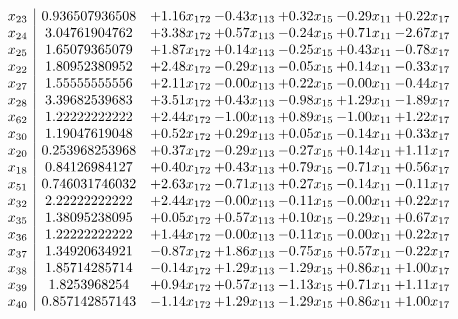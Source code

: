 \documentclass[8pt]{article}
\begin{document}
\[\begin{array}{c| c c@{\hskip 2pt} c@{\hskip 2pt} c@{\hskip 2pt} c@{\hskip 2pt} c@{\hskip 2pt} }
 x_{23}   &  0.936507936508 & +  1.16 x_{172} & -0.43 x_{113} & +  0.32 x_{15} & -0.29 x_{11} & +  0.22 x_{17}\\
 x_{24}   &  3.04761904762 & +  3.38 x_{172} & +  0.57 x_{113} & -0.24 x_{15} & +  0.71 x_{11} & -2.67 x_{17}\\
 x_{25}   &  1.65079365079 & +  1.87 x_{172} & +  0.14 x_{113} & -0.25 x_{15} & +  0.43 x_{11} & -0.78 x_{17}\\
 x_{22}   &  1.80952380952 & +  2.48 x_{172} & -0.29 x_{113} & -0.05 x_{15} & +  0.14 x_{11} & -0.33 x_{17}\\
 x_{27}   &  1.55555555556 & +  2.11 x_{172} & -0.00 x_{113} & +  0.22 x_{15} & -0.00 x_{11} & -0.44 x_{17}\\
 x_{28}   &  3.39682539683 & +  3.51 x_{172} & +  0.43 x_{113} & -0.98 x_{15} & +  1.29 x_{11} & -1.89 x_{17}\\
 x_{62}   &  1.22222222222 & +  2.44 x_{172} & -1.00 x_{113} & +  0.89 x_{15} & -1.00 x_{11} & +  1.22 x_{17}\\
 x_{30}   &  1.19047619048 & +  0.52 x_{172} & +  0.29 x_{113} & +  0.05 x_{15} & -0.14 x_{11} & +  0.33 x_{17}\\
 x_{20}   &  0.253968253968 & +  0.37 x_{172} & -0.29 x_{113} & -0.27 x_{15} & +  0.14 x_{11} & +  1.11 x_{17}\\
 x_{18}   &  0.84126984127 & +  0.40 x_{172} & +  0.43 x_{113} & +  0.79 x_{15} & -0.71 x_{11} & +  0.56 x_{17}\\
 x_{51}   &  0.746031746032 & +  2.63 x_{172} & -0.71 x_{113} & +  0.27 x_{15} & -0.14 x_{11} & -0.11 x_{17}\\
 x_{32}   &  2.22222222222 & +  2.44 x_{172} & -0.00 x_{113} & -0.11 x_{15} & -0.00 x_{11} & +  0.22 x_{17}\\
 x_{35}   &  1.38095238095 & +  0.05 x_{172} & +  0.57 x_{113} & +  0.10 x_{15} & -0.29 x_{11} & +  0.67 x_{17}\\
 x_{36}   &  1.22222222222 & +  1.44 x_{172} & -0.00 x_{113} & -0.11 x_{15} & -0.00 x_{11} & +  0.22 x_{17}\\
 x_{37}   &  1.34920634921 & -0.87 x_{172} & +  1.86 x_{113} & -0.75 x_{15} & +  0.57 x_{11} & -0.22 x_{17}\\
 x_{38}   &  1.85714285714 & -0.14 x_{172} & +  1.29 x_{113} & -1.29 x_{15} & +  0.86 x_{11} & +  1.00 x_{17}\\
 x_{39}   &  1.8253968254 & +  0.94 x_{172} & +  0.57 x_{113} & -1.13 x_{15} & +  0.71 x_{11} & +  1.11 x_{17}\\
 x_{40}   &  0.857142857143 & -1.14 x_{172} & +  1.29 x_{113} & -1.29 x_{15} & +  0.86 x_{11} & +  1.00 x_{17}\\

\end{array}\]
\end{document}
